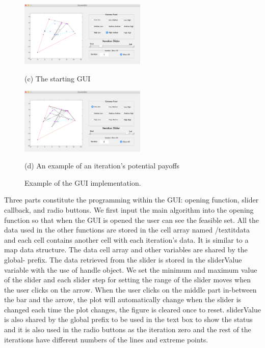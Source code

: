 \documentclass{article}
\begin{document}
\begin{figure}[htb]

\begin{minipage}[b]{1\linewidth}
  \centering
  \centerline{\includegraphics[width=6cm]{GUI3}}
  \centerline{(c) The starting GUI}\medskip
\end{minipage}
\hfill
\begin{minipage}[b]{1\linewidth}
  \centering
  \centerline{\includegraphics[width=6cm]{GUI4}}
  \centerline{(d) An example of an iteration's potential payoffs}\medskip
\end{minipage}
\caption{Example of the GUI implementation.}
\label{fig:res}

\end{figure}
Three parts constitute the programming within the GUI: opening function, slider callback, and radio buttons. We first input the main algorithm into the opening function so that when the GUI is opened the user can see the feasible set. All the data used in the other functions are stored in the cell array named /textit{data} and each cell contains another cell with each iteration's data. It is similar to a map data structure. The data cell array and other variables are shared by the global- prefix. The data retrieved from the slider is stored in the sliderValue variable with the use of handle object. We set the minimum and maximum value of the slider and each slider step for setting the range of the slider moves when the user clicks on the arrow. When the user clicks on the middle part in-between the bar and the arrow, the plot will automatically change when the slider is changed each time the plot changes, the figure is cleared once to reset. sliderValue is also shared by the global prefix to be used in the text box to show the status and it is also used in the radio buttons as the iteration zero and the rest of the iterations have different numbers of the lines and extreme points. 
\end{document}
